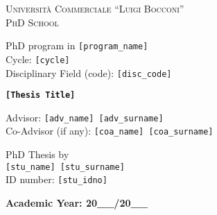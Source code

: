 \begin{titlepage}
  \Large  %
  \begin{center}
    {\LARGE \textsc{Università Commerciale ``Luigi Bocconi''} } \\
    {\LARGE \textsc{PhD School} }

    \vspace{1.5cm}

    \begin{raggedright}
      PhD program in \texttt{[program\_name]} \\
      Cycle: \texttt{[cycle]} \\
      Disciplinary Field (code): \texttt{[disc\_code]} \\
    \end{raggedright}

    \vfill

    {\Huge \bfseries \texttt{[Thesis Title]}}

    \vfill

    \begin{raggedright}
      Advisor: \texttt{[adv\_name] [adv\_surname]} \\
      Co-Advisor (if any): \texttt{[coa\_name] [coa\_surname]} \\
    \end{raggedright}

    \vspace{1.5cm}

    \begin{raggedleft}
      PhD Thesis by \\
      \texttt{[stu\_name] [stu\_surname]} \\
      ID number: \texttt{[stu\_idno]} \\
    \end{raggedleft}

    \vfill

    \textbf{Academic Year: 20\_\_/20\_\_}
  \end{center}
\end{titlepage}
